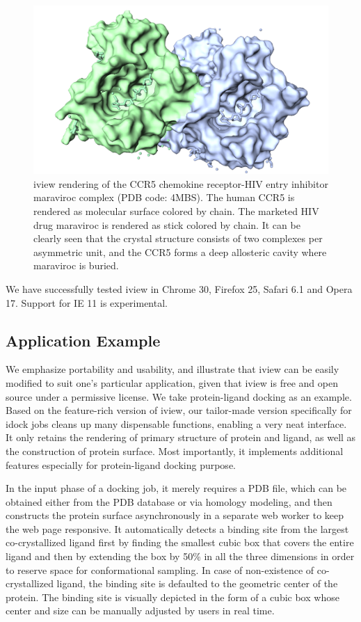 \documentclass{bioinfo}
\begin{document}
\begin{methods}
\begin{figure}[t]
\centerline{\includegraphics[width=\linewidth]{4MBS.png}}
\caption{iview rendering of the CCR5 chemokine receptor-HIV entry inhibitor maraviroc complex \citep{1348} (PDB code: 4MBS). The human CCR5 is rendered as molecular surface colored by chain. The marketed HIV drug maraviroc is rendered as stick colored by chain. It can be clearly seen that the crystal structure consists of two complexes per asymmetric unit, and the CCR5 forms a deep allosteric cavity where maraviroc is buried.}\label{fig:4MBS}
\end{figure}

We have successfully tested iview in Chrome 30, Firefox 25, Safari 6.1 and Opera 17. Support for IE 11 is experimental.

\subsection*{Application Example}
We emphasize portability and usability, and illustrate that iview can be easily modified to suit one's particular application, given that iview is free and open source under a permissive license. We take protein-ligand docking as an example. Based on the feature-rich version of iview, our tailor-made version specifically for idock jobs cleans up many dispensable functions, enabling a very neat interface. It only retains the rendering of primary structure of protein and ligand, as well as the construction of protein surface. Most importantly, it implements additional features especially for protein-ligand docking purpose.

In the input phase of a docking job, it merely requires a PDB file, which can be obtained either from the PDB database \citep{539,537} or via homology modeling, and then constructs the protein surface asynchronously in a separate web worker to keep the web page responsive. It automatically detects a binding site from the largest co-crystallized ligand first by finding the smallest cubic box that covers the entire ligand and then by extending the box by 50\% in all the three dimensions in order to reserve space for conformational sampling. In case of non-existence of co-crystallized ligand, the binding site is defaulted to the geometric center of the protein. The binding site is visually depicted in the form of a cubic box whose center and size can be manually adjusted by users in real time.


\end{methods}
\end{document}
